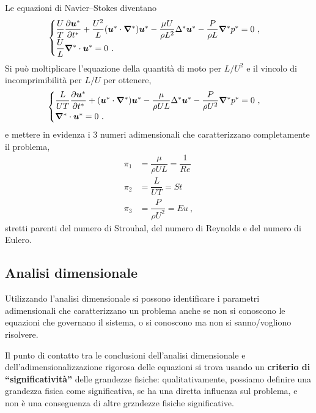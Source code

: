 \vspace{0.2cm}
\noindent
Le equazioni di Navier--Stokes diventano
\begin{equation}
\begin{cases}
 \dfrac{U}{T} \dfrac{\partial{\bm{u}^*}}{\partial{t^*}} + \dfrac{U^2}{L} ( \bm{u}^* \cdot \bm{\nabla}^* ) \bm{u}^* 
 - \dfrac{\mu U}{\rho L^2} \Delta^* \bm{u}^* - \dfrac{P}{\rho L} \bm{\nabla}^* p^* = 0 \ , \\
 \dfrac{U}{L} \bm{\nabla}^* \cdot \bm{u}^* = 0 \ .
\end{cases}
\end{equation}
Si può moltiplicare l'equazione della quantità di moto per $L/U^2$ e il vincolo di incomprimibilità per $L/U$ per ottenere,
\begin{equation}
\begin{cases}
 \dfrac{L}{U T} \dfrac{\partial{\bm{u}^*}}{\partial{t^*}} + ( \bm{u}^* \cdot \bm{\nabla}^* ) \bm{u}^* 
 - \dfrac{\mu}{\rho U L} \Delta^* \bm{u}^* - \dfrac{P}{\rho U^2} \bm{\nabla}^* p^* = 0 \ , \\
 \bm{\nabla}^* \cdot \bm{u}^* = 0 \ .
\end{cases}
\end{equation}
e mettere in evidenza i 3 numeri adimensionali che caratterizzano completamente il problema,
\begin{equation}
\begin{aligned}
 \pi_1 & = \dfrac{\mu}{\rho UL}= \dfrac{1}{Re} \\
 \pi_2 & = \dfrac{L}{U T} = St \\
 \pi_3 & = \dfrac{P}{\rho U^2} = Eu \ ,
\end{aligned}
\end{equation}
stretti parenti del numero di Strouhal, del numero di Reynolds e del numero di Eulero.

\subsection{Analisi dimensionale}
Utilizzando l'analisi dimensionale si possono identificare i parametri adimensionali che caratterizzano un problema anche se non si conoscono le equazioni che governano il sistema, o si conoscono ma non si sanno/vogliono risolvere.

Il punto di contatto tra le conclusioni dell'analisi dimensionale e dell'adimensionalizzazione rigorosa delle equazioni si trova usando un \textbf{criterio di ``significatività''} delle grandezze fisiche: qualitativamente, possiamo definire una grandezza fisica come significativa, se ha una diretta influenza sul problema, e non è una conseguenza di altre grzndezze fisiche significative.

